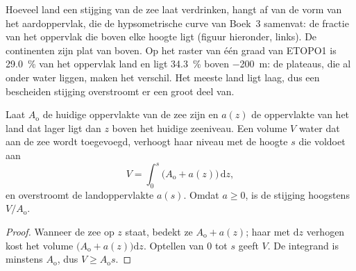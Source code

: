 Hoeveel land een stijging van de zee laat verdrinken, hangt af van de vorm van het aardoppervlak, die de
hypsometrische curve van Boek~3 samenvat: de fractie van het oppervlak die boven
elke hoogte ligt (figuur hieronder, links). De continenten zijn plat van boven. Op het raster van één graad van
ETOPO1 is \qty{29.0}{\percent} van het oppervlak land en ligt \qty{34.3}{\percent} boven
\qty{-200}{m}: de plateaus, die al onder water liggen, maken het verschil. Het meeste land ligt laag, dus een
bescheiden stijging overstroomt er een groot deel van.

\begin{proposition}\label{prop:b2:phanerozoic-earth:flooding}
Laat $A_{\text{o}}$ de huidige oppervlakte van de zee zijn en $a(z)$ de oppervlakte van het land dat lager ligt dan $z$ boven
het huidige zeeniveau. Een volume $V$ water dat aan de zee wordt toegevoegd, verhoogt haar niveau met de hoogte $s$
die voldoet aan
\[
V = \int_0^s \bigl(A_{\text{o}} + a(z)\bigr)\,\mathrm{d}z ,
\]
en overstroomt de landoppervlakte $a(s)$. Omdat $a \ge 0$, is de stijging hoogstens $V/A_{\text{o}}$.
\end{proposition}

\begin{proof}
Wanneer de zee op $z$ staat, bedekt ze $A_{\text{o}} + a(z)$; haar met $\mathrm{d}z$ verhogen kost
het volume $\bigl(A_{\text{o}} + a(z)\bigr)\mathrm{d}z$. Optellen van 0 tot $s$ geeft $V$. De
integrand is minstens $A_{\text{o}}$, dus $V \ge A_{\text{o}}s$.
\end{proof}

